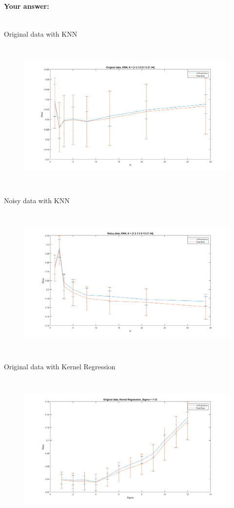 \documentclass[english]{article}
\begin{document}
\begin{itemize}
\paragraph{Your answer:}
 ~\\

Original data with KNN
\begin{figure}[H]
\centering
\includegraphics[width=7in, height=3in]{knn_OG_varyK.png}
\end{figure}

Noisy data with KNN
\begin{figure}[H]
\centering
\includegraphics[width=7in, height=3in]{knn_noisy_varyK.png}
\end{figure}

Original data with Kernel Regression
\begin{figure}[H]
\centering
\includegraphics[width=7in, height=3in]{kern_OG_varySIGMA.png}
\end{figure}


\end{itemize}
\end{document}
